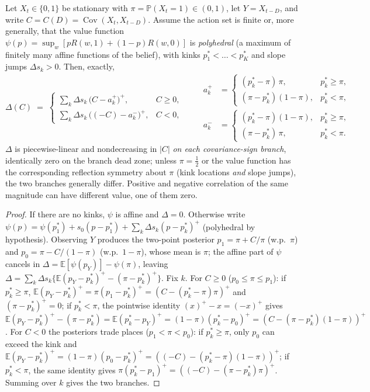 \documentclass[acmsmall,screen,review,anonymous]{acmart}
\newcommand{\E}{\mathbb{E}}
\begin{document}
\begin{theorem}\label{thm:hinge}
Let $X_t\in\{0,1\}$ be stationary with $\pi=\mathbb P(X_t{=}1)\in(0,1)$, let
$Y=X_{t-D}$, and write $C=C(D)=\operatorname{Cov}(X_t,X_{t-D})$. Assume the
action set is finite or, more generally, that the value function
$\psi(p)=\sup_w[pR(w,1)+(1-p)R(w,0)]$ is \emph{polyhedral} (a maximum of
finitely many affine functions of the belief), with kinks
$p^*_1<\dots<p^*_K$ and slope jumps $\Delta s_k>0$. Then, exactly,
\[
\Delta(C)\;=\;
\begin{cases}
\displaystyle\sum_{k}\Delta s_k\,\bigl(C-a^+_k\bigr)^{\!+}, & C\ge 0,\\[6pt]
\displaystyle\sum_{k}\Delta s_k\,\bigl((-C)-a^-_k\bigr)^{\!+}, & C< 0,
\end{cases}
\qquad
\begin{aligned}
a^+_k&=\begin{cases}(p^*_k-\pi)\,\pi, & p^*_k\ge\pi,\\
(\pi-p^*_k)(1-\pi), & p^*_k<\pi,\end{cases}\\
a^-_k&=\begin{cases}(p^*_k-\pi)(1-\pi), & p^*_k\ge\pi,\\
(\pi-p^*_k)\,\pi, & p^*_k<\pi.\end{cases}
\end{aligned}
\]
$\Delta$ is piecewise-linear and nondecreasing in $|C|$ \emph{on each
covariance-sign branch}, identically zero on the branch dead zone; unless
$\pi=\tfrac12$ or the value function has the corresponding reflection
symmetry about $\pi$ (kink locations \emph{and} slope jumps), the two
branches generally differ. Positive and negative correlation of the
same magnitude can have different value, one of them zero.
\end{theorem}

\begin{proof}
If there are no kinks, $\psi$ is affine and $\Delta=0$. Otherwise write
$\psi(p)=\psi(p^*_1)+s_0(p-p^*_1)+\sum_k\Delta s_k (p-p^*_k)^+$
(polyhedral by hypothesis). Observing
$Y$ produces the two-point posterior $p_1=\pi+C/\pi$ (w.p.\ $\pi$) and
$p_0=\pi-C/(1-\pi)$ (w.p.\ $1-\pi$), whose mean is $\pi$; the affine part
of $\psi$ cancels in $\Delta=\E[\psi(p_Y)]-\psi(\pi)$, leaving
$\Delta=\sum_k\Delta s_k\{\E(p_Y-p^*_k)^+-(\pi-p^*_k)^+\}$. Fix $k$. For
$C\ge0$ ($p_0\le\pi\le p_1$): if $p^*_k\ge\pi$,
$\E(p_Y-p^*_k)^+=\pi(p_1-p^*_k)^+=(C-(p^*_k-\pi)\pi)^+$ and
$(\pi-p^*_k)^+=0$; if $p^*_k<\pi$, the pointwise identity $(x)^+-x=(-x)^+$
gives $\E(p_Y-p^*_k)^+-(\pi-p^*_k)=\E(p^*_k-p_Y)^+
=(1-\pi)(p^*_k-p_0)^+=(C-(\pi-p^*_k)(1-\pi))^+$. For $C<0$ the posteriors
trade places ($p_1<\pi<p_0$): if $p^*_k\ge\pi$, only $p_0$ can exceed the
kink and $\E(p_Y-p^*_k)^+=(1-\pi)(p_0-p^*_k)^+=((-C)-(p^*_k-\pi)(1-\pi))^+$;
if $p^*_k<\pi$, the same identity gives
$\pi(p^*_k-p_1)^+=((-C)-(\pi-p^*_k)\pi)^+$. Summing over $k$ gives the two
branches.
\end{proof}
\end{document}
